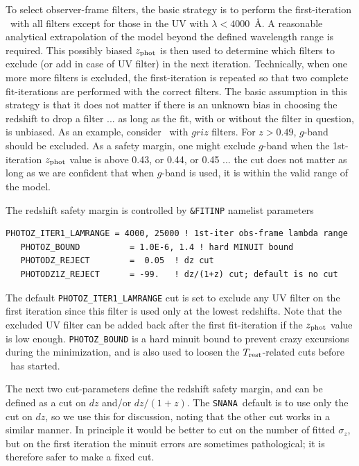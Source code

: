 \documentclass[12pt]{article}
\newcommand{\Trest}{T_{\rm rest}}
\newcommand{\snana}{{\tt SNANA}}
\newcommand{\Zphot}{z_{\rm phot}}
\begin{document}
To select observer-frame filters,
the basic strategy is to perform the first-iteration
\lcfitz\ with all filters except for those in 
the UV with $\lambda < 4000$~\AA.
A reasonable analytical extrapolation of the model beyond the 
defined wavelength range is required. This possibly biased 
$\Zphot$ is then used to determine which filters to exclude
(or add in case of UV filter) in the next iteration. 
Technically, when one more more filters is excluded, 
the first-iteration is repeated so that two complete 
fit-iterations are performed with the correct filters. 
The basic assumption in this strategy is that it does 
not matter if there is an unknown bias in choosing 
the redshift to drop a filter ... as long as the fit,
with or without the filter in question, is unbiased.
As an example, consider \lcfitz\ with $griz$ filters.
For $z>0.49$, $g$-band should be excluded. As a safety margin,
one might exclude $g$-band when the 1st-iteration $\Zphot$ value
is above 0.43, or 0.44, or 0.45 ... the cut does not matter as
long as we are confident that when $g$-band is used, 
it is within the valid range of the model.


The redshift safety margin is controlled by {\tt \&FITINP} namelist 
parameters 
%
\begin{Verbatim}[frame=single]
   PHOTOZ_ITER1_LAMRANGE = 4000, 25000 ! 1st-iter obs-frame lambda range
   PHOTOZ_BOUND          = 1.0E-6, 1.4 ! hard MINUIT bound
   PHOTODZ_REJECT        =  0.05  ! dz cut
   PHOTODZ1Z_REJECT      = -99.   ! dz/(1+z) cut; default is no cut
\end{Verbatim}
The default \verb|PHOTOZ_ITER1_LAMRANGE| cut is set to exclude
any UV filter on the first iteration since this filter is used
only at the lowest redshifts. Note that the excluded UV filter
can be added back after the first fit-iteration if the $\Zphot$
value is low enough.  \verb|PHOTOZ_BOUND| is a hard {\sc minuit}
bound to prevent crazy excursions during the minimization,
and is also used to loosen the $\Trest$-related cuts
before \lcfitz\ has started.


The next two cut-parameters define the redshift safety margin,
and can be defined as a cut on $dz$  and/or  $dz/(1+z)$.
The \snana\ default is to use only the cut on $dz$,
so we use this for discussion, noting that the other
cut works in a similar manner.  In principle it would be
better to cut on the number of fitted $\sigma_z$,
but on the first iteration the {\sc minuit} errors
are sometimes pathological; it is therefore safer to make
a fixed cut.
\end{document}
